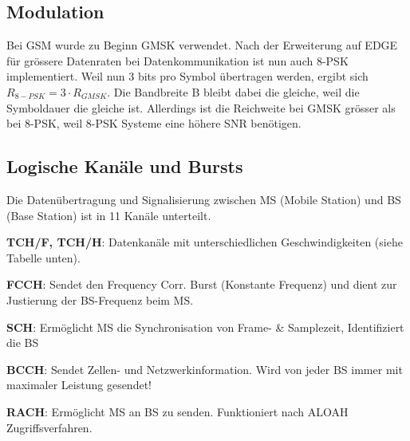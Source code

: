 \subsection{Modulation}
	Bei GSM wurde zu Beginn GMSK verwendet. Nach der Erweiterung auf EDGE für grössere Datenraten 
	bei Datenkommunikation ist nun auch 8-PSK implementiert. 
	Weil nun 3 bits pro Symbol übertragen werden, ergibt sich $R_{8-PSK}=3\cdot R_{GMSK}$. Die 
	Bandbreite B bleibt dabei die gleiche, weil die Symboldauer die gleiche ist. Allerdings 
	ist die Reichweite bei GMSK grösser als bei 8-PSK, weil 8-PSK Systeme eine höhere SNR benötigen.
	
\subsection{Logische Kanäle und Bursts}
    Die Datenübertragung und Signalisierung zwischen MS (Mobile Station) und BS (Base Station) ist in 11 Kanäle 
    unterteilt.
    \begin{liste}
        \item \textbf{TCH/F, TCH/H}: Datenkanäle mit unterschiedlichen Geschwindigkeiten (siehe Tabelle unten).
        \item \textbf{FCCH}: Sendet den  Frequency Corr. Burst (Konstante Frequenz) und dient zur Justierung der BS-Frequenz beim MS.
        \item \textbf{SCH}: Ermöglicht MS die Synchronisation von Frame- \& Samplezeit, Identifiziert die BS
        \item \textbf{BCCH}: Sendet Zellen- und Netzwerkinformation. Wird von jeder BS immer mit maximaler Leistung gesendet!
        \item \textbf{RACH}: Ermöglicht MS an BS zu senden. Funktioniert nach ALOAH Zugriffsverfahren.
    \end{liste}

